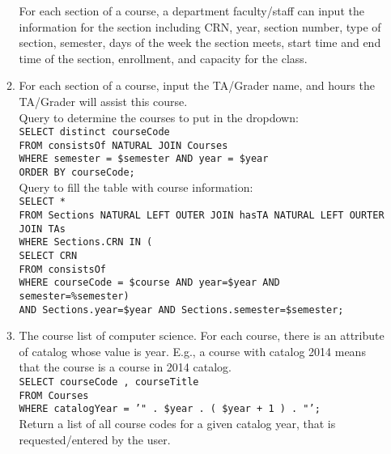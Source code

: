 \begin{enumerate}
\begin{enumerate}
				For each section of a course, a department faculty/staff can input the information for the section including CRN, year, section number, type of section, semester, days of the week the section meets, start time and end time of the section, enrollment, and capacity for the class. 

		\item 	For each section of a course, input the TA/Grader name, and hours the TA/Grader will assist this course.\\

				Query to determine the courses to put in the dropdown:\\
				\texttt{SELECT distinct courseCode\\
						FROM consistsOf NATURAL JOIN Courses\\
						WHERE semester = \$semester AND year = \$year\\
						ORDER BY courseCode;}\\

				Query to fill the table with course information:\\
				\texttt{SELECT * \\
						FROM Sections NATURAL LEFT OUTER JOIN hasTA NATURAL LEFT OURTER JOIN TAs\\
						WHERE Sections.CRN IN (\\
							\tab SELECT CRN\\
							\tab FROM consistsOf\\
							\tab WHERE courseCode = \$course AND year=\$year AND semester=\%semester)\\
						AND Sections.year=\$year AND Sections.semester=\$semester;}\\

				
		\item 	The course list of computer science. For each course, there is an attribute of catalog whose value is year. E.g., a course with catalog 2014 means that the course is a course in 2014 catalog.\\

				\texttt{SELECT courseCode , courseTitle \\
						FROM Courses\\
						WHERE catalogYear = '" . \$year . ( \$year + 1 ) . "';}\\
				
						Return a list of all course codes for a given catalog year, that is requested/entered by the user.  
			
	\end{enumerate}


\end{enumerate}
